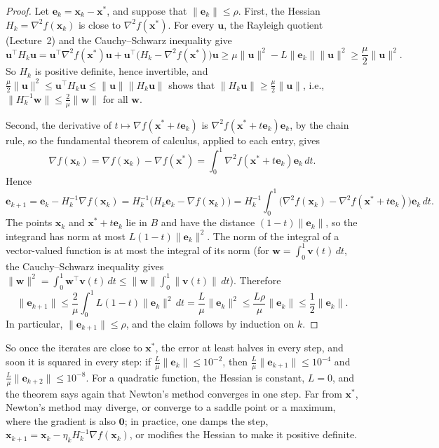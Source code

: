 \documentclass[11pt]{article}
\newcommand{\norm}[1]{\lVert #1 \rVert}
\theoremstyle{definition}
\theoremstyle{plain}
\theoremstyle{remark}
\begin{document}
\begin{proof}
    Let $\mathbf{e}_k = \mathbf{x}_k - \mathbf{x}^*$, and suppose that $\norm{\mathbf{e}_k} \leq \rho$. First, the Hessian $H_k = \nabla^2 f(\mathbf{x}_k)$ is close to $\nabla^2 f(\mathbf{x}^*)$. For every $\mathbf{u}$, the Rayleigh quotient (Lecture~2) and the Cauchy--Schwarz inequality give
    \[\mathbf{u}^\top H_k\mathbf{u} = \mathbf{u}^\top\nabla^2 f(\mathbf{x}^*)\mathbf{u} + \mathbf{u}^\top\big(H_k - \nabla^2 f(\mathbf{x}^*)\big)\mathbf{u} \geq \mu\norm{\mathbf{u}}^2 - L\norm{\mathbf{e}_k}\norm{\mathbf{u}}^2 \geq \frac{\mu}{2}\norm{\mathbf{u}}^2.\]
    So $H_k$ is positive definite, hence invertible, and $\frac{\mu}{2}\norm{\mathbf{u}}^2 \leq \mathbf{u}^\top H_k\mathbf{u} \leq \norm{\mathbf{u}}\norm{H_k\mathbf{u}}$ shows that $\norm{H_k\mathbf{u}} \geq \frac{\mu}{2}\norm{\mathbf{u}}$, i.e., $\norm{H_k^{-1}\mathbf{w}} \leq \frac{2}{\mu}\norm{\mathbf{w}}$ for all $\mathbf{w}$.

    Second, the derivative of $t \mapsto \nabla f(\mathbf{x}^* + t\mathbf{e}_k)$ is $\nabla^2 f(\mathbf{x}^* + t\mathbf{e}_k)\mathbf{e}_k$, by the chain rule, so the fundamental theorem of calculus, applied to each entry, gives
    \[\nabla f(\mathbf{x}_k) = \nabla f(\mathbf{x}_k) - \nabla f(\mathbf{x}^*) = \int_0^1 \nabla^2 f(\mathbf{x}^* + t\mathbf{e}_k)\mathbf{e}_k\, dt.\]
    Hence
    \[\mathbf{e}_{k+1} = \mathbf{e}_k - H_k^{-1}\nabla f(\mathbf{x}_k) = H_k^{-1}\big(H_k\mathbf{e}_k - \nabla f(\mathbf{x}_k)\big) = H_k^{-1}\int_0^1 \big(\nabla^2 f(\mathbf{x}_k) - \nabla^2 f(\mathbf{x}^* + t\mathbf{e}_k)\big)\mathbf{e}_k\, dt.\]
    The points $\mathbf{x}_k$ and $\mathbf{x}^* + t\mathbf{e}_k$ lie in $B$ and have the distance $(1 - t)\norm{\mathbf{e}_k}$, so the integrand has norm at most $L(1 - t)\norm{\mathbf{e}_k}^2$. The norm of the integral of a vector-valued function is at most the integral of its norm (for $\mathbf{w} = \int_0^1 \mathbf{v}(t)\, dt$, the Cauchy--Schwarz inequality gives $\norm{\mathbf{w}}^2 = \int_0^1 \mathbf{w}^\top\mathbf{v}(t)\, dt \leq \norm{\mathbf{w}}\int_0^1 \norm{\mathbf{v}(t)}\, dt$). Therefore
    \[\norm{\mathbf{e}_{k+1}} \leq \frac{2}{\mu}\int_0^1 L(1 - t)\norm{\mathbf{e}_k}^2\, dt = \frac{L}{\mu}\norm{\mathbf{e}_k}^2 \leq \frac{L\rho}{\mu}\norm{\mathbf{e}_k} \leq \frac{1}{2}\norm{\mathbf{e}_k}.\]
    In particular, $\norm{\mathbf{e}_{k+1}} \leq \rho$, and the claim follows by induction on $k$.
\end{proof}

So once the iterates are close to $\mathbf{x}^*$, the error at least halves in every step, and soon it is squared in every step: if $\frac{L}{\mu}\norm{\mathbf{e}_k} \leq 10^{-2}$, then $\frac{L}{\mu}\norm{\mathbf{e}_{k+1}} \leq 10^{-4}$ and $\frac{L}{\mu}\norm{\mathbf{e}_{k+2}} \leq 10^{-8}$. For a quadratic function, the Hessian is constant, $L = 0$, and the theorem says again that Newton's method converges in one step. Far from $\mathbf{x}^*$, Newton's method may diverge, or converge to a saddle point or a maximum, where the gradient is also $\mathbf{0}$; in practice, one damps the step, $\mathbf{x}_{k+1} = \mathbf{x}_k - \eta_k H_k^{-1}\nabla f(\mathbf{x}_k)$, or modifies the Hessian to make it positive definite.
\end{document}
